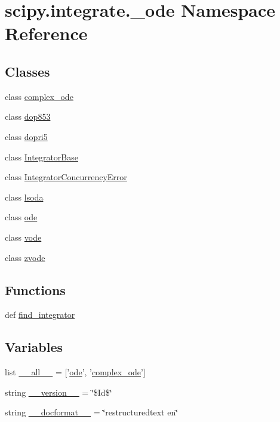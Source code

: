 \hypertarget{namespacescipy_1_1integrate_1_1__ode}{}\section{scipy.\+integrate.\+\_\+ode Namespace Reference}
\label{namespacescipy_1_1integrate_1_1__ode}
\subsection*{Classes}
\begin{DoxyCompactItemize}
\item 
class \hyperlink{classscipy_1_1integrate_1_1__ode_1_1complex__ode}{complex\+\_\+ode}
\item 
class \hyperlink{classscipy_1_1integrate_1_1__ode_1_1dop853}{dop853}
\item 
class \hyperlink{classscipy_1_1integrate_1_1__ode_1_1dopri5}{dopri5}
\item 
class \hyperlink{classscipy_1_1integrate_1_1__ode_1_1IntegratorBase}{Integrator\+Base}
\item 
class \hyperlink{classscipy_1_1integrate_1_1__ode_1_1IntegratorConcurrencyError}{Integrator\+Concurrency\+Error}
\item 
class \hyperlink{classscipy_1_1integrate_1_1__ode_1_1lsoda}{lsoda}
\item 
class \hyperlink{classscipy_1_1integrate_1_1__ode_1_1ode}{ode}
\item 
class \hyperlink{classscipy_1_1integrate_1_1__ode_1_1vode}{vode}
\item 
class \hyperlink{classscipy_1_1integrate_1_1__ode_1_1zvode}{zvode}
\end{DoxyCompactItemize}
\subsection*{Functions}
\begin{DoxyCompactItemize}
\item 
def \hyperlink{namespacescipy_1_1integrate_1_1__ode_a37ef8d7a70a51c8bb0877e9fe75f32d4}{find\+\_\+integrator}
\end{DoxyCompactItemize}
\subsection*{Variables}
\begin{DoxyCompactItemize}
\item 
list \hyperlink{namespacescipy_1_1integrate_1_1__ode_a31ea1936681fdba850b7d2bf33c534e7}{\+\_\+\+\_\+all\+\_\+\+\_\+} = \mbox{[}'\hyperlink{classscipy_1_1integrate_1_1__ode_1_1ode}{ode}', '\hyperlink{classscipy_1_1integrate_1_1__ode_1_1complex__ode}{complex\+\_\+ode}'\mbox{]}
\item 
string \hyperlink{namespacescipy_1_1integrate_1_1__ode_adede8cff83f3f8ad47fd7ee14d55d4a8}{\+\_\+\+\_\+version\+\_\+\+\_\+} = \char`\"{}\$Id\$\char`\"{}
\item 
string \hyperlink{namespacescipy_1_1integrate_1_1__ode_a9428302f044ee6434234b187342e2faa}{\+\_\+\+\_\+docformat\+\_\+\+\_\+} = \char`\"{}restructuredtext en\char`\"{}
\end{DoxyCompactItemize}


